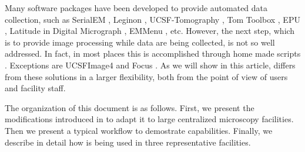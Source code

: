 Many software packages have been developed to provide automated data collection, such as SerialEM \citep{Mastronarde2005}, Leginon \citep{Suloway2009}, UCSF-Tomography \citep{Zheng2007}, Tom Toolbox \citep{Nickell2005}, EPU \citep{EPU}, Latitude in Digital Micrograph \citep{Latitude}, EMMenu \citep{emmenu}, etc. However, the next step,  which is to provide image processing while  data are being collected, is not so well addressed. In fact, in most places this is accomplished through home made scripts \citep[i.e.][]{Pichkur2018}. %
Exceptions are UCSFImage4 \citep{Li2015} and Focus \citep{Biyani2017}. As we will show in this article, \scipion differs from these solutions in a larger flexibility, both from the point of view of users and facility staff.

The organization of this document is as follows. First, we present the modifications introduced in \scipion to adapt it to large centralized microscopy facilities. Then we present a typical workflow to demostrate \scipion capabilities. Finally,  we describe in detail how \scipion is being used in three representative facilities.

